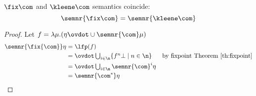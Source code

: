 \begin{proposition}\label{prop:samenr}
  \(\fix\com\) and \(\kleene\com\) semantics coincide:
  \begin{equation*}
    \semnr{\fix\com} = \semnr{\kleene\com}
  \end{equation*}
\end{proposition}

\begin{proof}
  Let
  \(f = \lambda \mu . (\eta \ovdot\cup \semnr{\com}\mu)\)
  \begin{align*}
    \semnr{\fix{\com}}\eta & = \lfp(f) \\
                           & = \textstyle\ovdot\bigcup_{i\in\n}\{f^n\bot \mid n \in \n\} & \text{by fixpoint Theorem~\ref{th:fixpoint}} \\
                           & = \textstyle\ovdot\bigcup_{i\in\n}\semnr{\com}^i\eta \\
                           & = \semnr{\com^*}\eta
  \end{align*}
\end{proof}
